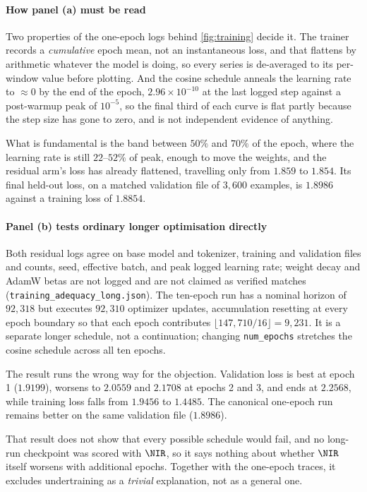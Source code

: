 \paragraph{How panel (a) must be read} Two properties of the one-epoch logs behind
\cref{fig:training} decide it. The trainer records a
\emph{cumulative} epoch mean, not an instantaneous loss, and that flattens by
arithmetic whatever the model is doing, so every series is de-averaged to its
per-window value before plotting. And the cosine schedule anneals the learning
rate to $\approx 0$ by the end of the epoch, $2.96 \times 10^{-10}$ at the last
logged step against a post-warmup peak of $10^{-5}$, so the final third of each
curve is flat partly because the step size has gone to zero, and is not
independent evidence of anything.

What is fundamental is the band between $50\%$ and $70\%$ of the epoch, where
the learning rate is still $22$--$52\%$ of peak, enough to move the weights, and
the residual arm's loss has already flattened, travelling only from $1.859$ to
$1.854$. Its final held-out loss, on a matched validation file of $3{,}600$
examples, is $1.8986$ against a training loss of $1.8854$.

\paragraph{Panel (b) tests ordinary longer optimisation directly} Both residual
logs agree on base model and tokenizer,
training and validation files and counts, seed, effective batch, and peak logged
learning rate; weight decay and AdamW betas are not logged and are not claimed
as verified matches (\texttt{training\_adequacy\_}\allowbreak\texttt{long.json}). The ten-epoch run
has a nominal horizon of $92{,}318$ but executes $92{,}310$ optimizer updates,
accumulation resetting at every epoch boundary so that each epoch contributes
$\lfloor147{,}710/16\rfloor=9{,}231$. It is a separate longer schedule, not a
continuation; changing \texttt{num\_epochs} stretches the cosine schedule across
all ten epochs.

The result runs the wrong way for the objection. Validation loss is best at
epoch 1 ($1.9199$), worsens to $2.0559$ and $2.1708$ at epochs 2 and 3, and ends
at $2.2568$, while training loss falls from $1.9456$ to $1.4485$. The canonical
one-epoch run remains better on the same validation file ($1.8986$).

\begin{scopelimit}
That result does not show that every possible schedule would fail, and no
long-run checkpoint was scored with $\NIR$, so it says nothing about whether
$\NIR$ itself worsens with additional epochs. Together with the one-epoch
traces, it excludes undertraining as a \emph{trivial} explanation, not as a
general one.
\end{scopelimit}

